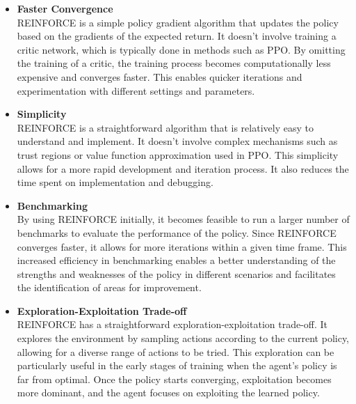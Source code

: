 \begin{itemize}

\item {\bf Faster Convergence }\\
REINFORCE is a simple policy gradient algorithm that updates the policy based on the gradients of the expected return. It doesn't involve training a critic network, which is typically done in methods such as PPO. By omitting the training of a critic, the training process becomes computationally less expensive and converges faster. This enables quicker iterations and experimentation with different settings and parameters.

\item {\bf Simplicity}\\
REINFORCE is a straightforward algorithm that is relatively easy to understand and implement. It doesn't involve complex mechanisms such as trust regions or value function approximation used in PPO. This simplicity allows for a more rapid development and iteration process. It also reduces the time spent on implementation and debugging.

\item {\bf Benchmarking}\\
By using REINFORCE initially, it becomes feasible to run a larger number of benchmarks to evaluate the performance of the policy. Since REINFORCE converges faster, it allows for more iterations within a given time frame. This increased efficiency in benchmarking enables a better understanding of the strengths and weaknesses of the policy in different scenarios and facilitates the identification of areas for improvement.

\item {\bf Exploration-Exploitation Trade-off}\\
REINFORCE has a straightforward exploration-exploitation trade-off. It explores the environment by sampling actions according to the current policy, allowing for a diverse range of actions to be tried. This exploration can be particularly useful in the early stages of training when the agent's policy is far from optimal. Once the policy starts converging, exploitation becomes more dominant, and the agent focuses on exploiting the learned policy.


\end{itemize}
